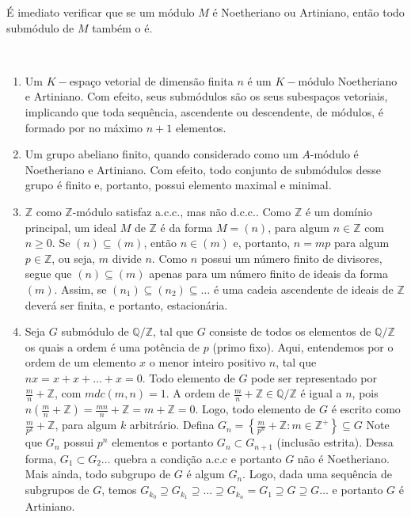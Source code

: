 É imediato verificar que se um módulo $M$ é Noetheriano ou Artiniano, então todo submódulo de $M$ também o é.
\begin{examples}
	\label{loc:def_2_:_noetheriano_e_artiniano.exemplos}
	$ $
	\begin{enumerate}
		\item Um $K-$espaço vetorial de dimensão finita $n$ é um $K-$módulo Noetheriano e Artiniano.
		      Com efeito, seus submódulos são os seus subespaços vetoriais, implicando que toda sequência, ascendente ou descendente, de módulos, é formado por no máximo $n+1$ elementos.
		\item Um grupo abeliano finito, quando considerado como um $A$-módulo é Noetheriano e Artiniano.
		      Com efeito, todo conjunto de submódulos desse grupo é finito e, portanto, possui elemento maximal e minimal.
		\item  $\mathbb{Z}$ como $\mathbb{Z}$-módulo satisfaz a.c.c., mas não d.c.c..
		      Como $\mathbb{Z}$ é um domínio principal, um ideal $M$ de $\mathbb{Z}$ é da forma $M=(n)$, para algum $n \in \mathbb{Z}$ com $n \geq 0$. Se $(n) \subseteq(m)$, então $n \in (m)$ e, portanto, $n=mp$ para algum $p \in \mathbb{Z}$, ou seja, $m$ divide $n$. Como $n$ possui um número finito de divisores, segue que $(n)\subseteq(m)$ apenas para um número finito de ideais da forma $(m)$. Assim, se $(n_{1}) \subseteq(n_{2}) \subseteq \dots$ é uma cadeia ascendente de ideais de $\mathbb{Z}$ deverá ser finita, e portanto, estacionária.
		\item Seja $G$ submódulo de $\mathbb{Q}/\mathbb{Z}$, tal que $G$ consiste de todos os elementos de $\mathbb{Q}/\mathbb{Z}$ os quais a ordem é uma potência de $p$ (primo fixo).
		      Aqui, entendemos por o ordem de um elemento $x$ o menor inteiro positivo $n$, tal que $nx = x + x +\dots+x=0$.
		      Todo elemento de $G$ pode ser representado por $\frac{m}{n}+\mathbb{Z}$, com $mdc(m,n)=1$.
		      A ordem de $\frac{m}{n}+\mathbb{Z} \in \mathbb{Q}/\mathbb{Z}$ é igual a $n$, pois $n\left( \frac{m}{n}+\mathbb{Z} \right) = \frac{mn}{n}+\mathbb{Z}=m+\mathbb{Z}=0$.
		      Logo, todo elemento de $G$ é escrito como $\frac{m}{p^{k}}+\mathbb{Z}$, para algum $k$ arbitrário.
		      Defina $G_{n}=\left\{  \frac{m}{p^{n}}+\mathbb{Z}  :m \in \mathbb{Z}^{+}\right\} \subseteq G$
		      Note que $G_{n}$ possui $p^{n}$ elementos e portanto $G_{n}\subset G_{n+1}$ (inclusão estrita).
		      Dessa forma, $G_{1}\subset G_{2}\dots$ quebra a condição a.c.c e portanto $G$ não é Noetheriano.
		      Mais ainda, todo subgrupo de $G$ é algum $G_{n}$. Logo, dada uma sequência de subgrupos de $G$, temos $G_{k_{0}}\supseteq G_{k_{1}}\supseteq\dots \supseteq G_{k_{n}}=G_{1}\supseteq G\supseteq G\dots$ e portanto $G$ é Artiniano.

\end{enumerate}
\end{examples}
